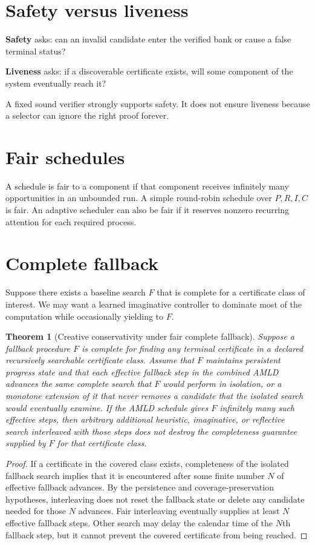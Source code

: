 \documentclass[11pt,openany]{book}
\newtheorem{theorem}{Theorem}[chapter]
\theoremstyle{definition}
\theoremstyle{remark}
\begin{document}
\section{Safety versus liveness}
\textbf{Safety} asks: can an invalid candidate enter the verified bank or cause a false terminal status?

\textbf{Liveness} asks: if a discoverable certificate exists, will some component of the system eventually reach it?

A fixed sound verifier strongly supports safety. It does not ensure liveness because a selector can ignore the right proof forever.

\section{Fair schedules}
A schedule is fair to a component if that component receives infinitely many opportunities in an unbounded run. A simple round-robin schedule over $P,R,I,C$ is fair. An adaptive scheduler can also be fair if it reserves nonzero recurring attention for each required process.

\section{Complete fallback}
Suppose there exists a baseline search $F$ that is complete for a certificate class of interest. We may want a learned imaginative controller to dominate most of the computation while occasionally yielding to $F$.

\begin{theorem}[Creative conservativity under fair complete fallback]\label{thm:fallback}
Suppose a fallback procedure $F$ is complete for finding any terminal certificate in a declared recursively searchable certificate class. Assume that $F$ maintains persistent progress state and that each effective fallback step in the combined AMLD advances the same complete search that $F$ would perform in isolation, or a monotone extension of it that never removes a candidate that the isolated search would eventually examine. If the AMLD schedule gives $F$ infinitely many such effective steps, then arbitrary additional heuristic, imaginative, or reflective search interleaved with those steps does not destroy the completeness guarantee supplied by $F$ for that certificate class.
\end{theorem}
\begin{proof}
If a certificate in the covered class exists, completeness of the isolated fallback search implies that it is encountered after some finite number $N$ of effective fallback advances. By the persistence and coverage-preservation hypotheses, interleaving does not reset the fallback state or delete any candidate needed for those $N$ advances. Fair interleaving eventually supplies at least $N$ effective fallback steps. Other search may delay the calendar time of the $N$th fallback step, but it cannot prevent the covered certificate from being reached.
\end{proof}
\end{document}
